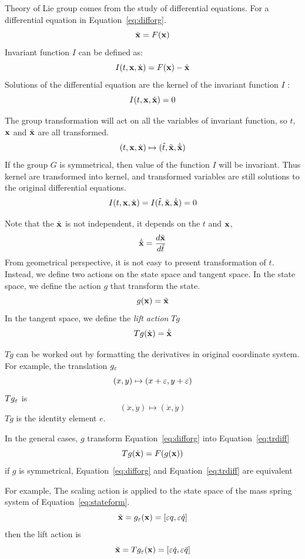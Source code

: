 Theory of Lie group comes from the study of differential equations.
For a differential equation in Equation~\ref{eq:difforg}.
\begin{equation}
\label{eq:difforg}
\dot{\mathbf{x}}=F(\mathbf{x})
\end{equation}
Invariant function $I$ can be defined as:
\[
I(t,\mathbf{x},\dot{\mathbf{x}})=F(\mathbf{x})-\dot{\mathbf{x}}
\]
Solutions of the differential equation are the kernel of the invariant function $I$ :
 \[
 I(t,\mathbf{x},\dot{\mathbf{x}})=0
 \]
 
 
The group transformation will act on all the variables of invariant function, so $t$,$\mathbf{x}$ and $\dot{\mathbf{x}}$ are all transformed.
\[
(t,\mathbf{x},\dot{\mathbf{x}}) \mapsto (\tilde{t},\tilde{\mathbf{x}},\dot{\tilde{\mathbf{x}}})
\]
If the group $G$ is symmetrical, then value of the  function $I$ will be invariant.
Thus kernel are transformed into kernel, and transformed variables are still solutions to the original differential equations. 
\[
I(t,\mathbf{x},\dot{\mathbf{x}})=I(\tilde{t},\tilde{\mathbf{x}},\dot{\tilde{\mathbf{x}}})=0
\]


Note that the $\dot{\mathbf{x}}$ is not independent, it depends on the $t$ and $\mathbf{x}$,
\[
\dot{\tilde{\mathbf{x}}}=\frac{d \tilde{\mathbf{x}} }{d \tilde{t}}
\]
From geometrical perspective, it is not easy to present  transformation of $t$.
Instead, we define two actions on the state space and tangent space.
In the state space, we define the  action $g$ that transform the state. 
\[
g(\mathbf{x})=\tilde{\mathbf{x}}
\]
In the tangent space, we define the \emph{lift action} $Tg$ 
\[
Tg(\dot{\mathbf{x}})=\dot{\tilde{\mathbf{x}}}
\]

$Tg$ can be worked out by formatting the derivatives in original coordinate system.
For example, the translation $g_{\varepsilon}$ 
\[
(x,y)\mapsto (x+\varepsilon,y+\varepsilon)
\]
$Tg_{\varepsilon}$ is
\[
(\dot{x},\dot{y}) \mapsto (\dot{x},\dot{y})
\]
$Tg$ is the identity element $e$.


In the general cases, $g$ transform Equation~\ref{eq:difforg} into Equation~\ref{eq:trdiff}
\begin{equation}
\label{eq:trdiff}
Tg(\dot{\mathbf{x}})=F(g(\mathbf{x}))
\end{equation}
if $g$ is symmetrical, Equation~\ref{eq:difforg} and Equation~\ref{eq:trdiff} are equivalent







 	
For example, 
The scaling action is applied to the state space of the mass spring system of Equation~\ref{eq:stateform}. 
\[
\tilde{\mathbf{x}}=g_{\varepsilon}(\mathbf{x})=[\varepsilon q, \varepsilon \dot{q} ]
\]
then the lift action is
\[
\tilde{\mathbf{x}}=Tg_{\varepsilon}(\mathbf{x})=[\varepsilon \dot{q}, \varepsilon \ddot{q}]
\]



